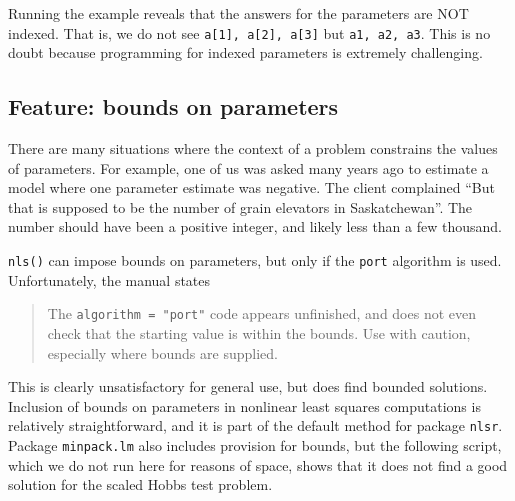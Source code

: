 \documentclass[
]{article}
\begin{document}
Running the example reveals that the answers for the parameters are NOT
indexed. That is, we do not see \texttt{a{[}1{]},\ a{[}2{]},\ a{[}3{]}}
but \texttt{a1,\ a2,\ a3}. This is no doubt because programming for
indexed parameters is extremely challenging.

\hypertarget{feature-bounds-on-parameters}{%
\subsection{Feature: bounds on
parameters}\label{feature-bounds-on-parameters}}

There are many situations where the context of a problem constrains the
values of parameters. For example, one of us was asked many years ago to
estimate a model where one parameter estimate was negative. The client
complained ``But that is supposed to be the number of grain elevators in
Saskatchewan''. The number should have been a positive integer, and
likely less than a few thousand.

\texttt{nls()} can impose bounds on parameters, but only if the
\texttt{port} algorithm is used. Unfortunately, the manual states

\begin{quote}
The \texttt{algorithm\ =\ "port"} code appears unfinished, and does not
even check that the starting value is within the bounds. Use with
caution, especially where bounds are supplied.
\end{quote}

This is clearly unsatisfactory for general use, but does find bounded
solutions. Inclusion of bounds on parameters in nonlinear least squares
computations is relatively straightforward, and it is part of the
default method for package \texttt{nlsr}. Package \texttt{minpack.lm}
also includes provision for bounds, but the following script, which we
do not run here for reasons of space, shows that it does not find a good
solution for the scaled Hobbs test problem.
\end{document}

